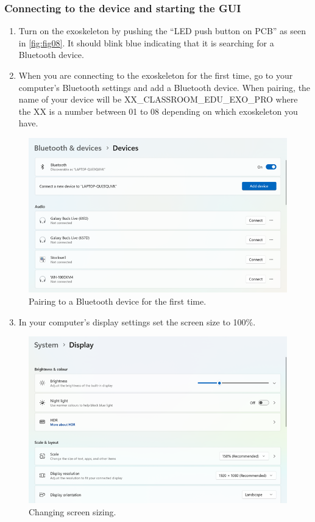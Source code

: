 \subsubsection{Connecting to the device and starting the GUI}
\begin{enumerate}[]
	\item Turn on the exoskeleton by pushing the “LED push button on PCB” as seen in \autoref{fig:fig08}. It  should blink blue indicating that it is searching for a Bluetooth device.
	\item When you are connecting to the exoskeleton for the first time, go to your computer's Bluetooth settings and add a Bluetooth device. When pairing, the name of your device will be XX\_CLASSROOM\_EDU\_EXO\_PRO where the XX is a number between 01 to 08 depending on which exoskeleton you have.
\end{enumerate}

\begin{figure}[H]
	\centering
	\includegraphics[width=0.7\linewidth]{img/fig_08}
	\caption{Pairing to a Bluetooth device for the first time.}
	\label{fig:fig08}
\end{figure}
\begin{enumerate}[]
	\setcounter{enumi}{2}
	\item In your computer's display settings set the screen size to 100\%.
\end{enumerate}
\begin{figure}[H]
	\centering
	\includegraphics[width=0.7\linewidth]{img/fig_09}
	\caption{Changing screen sizing.}
	\label{fig:fig09}
\end{figure}

